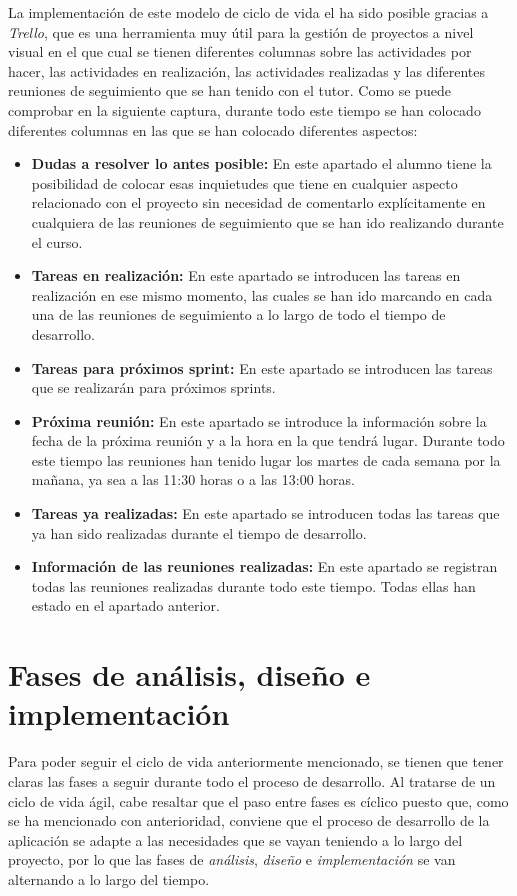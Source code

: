 La implementación de este modelo de ciclo de vida el ha sido posible gracias a
\textit{Trello}, que es una herramienta muy útil para la gestión de proyectos a
nivel visual en el que cual se tienen diferentes columnas sobre las actividades
por hacer, las actividades en realización, las actividades realizadas y las
diferentes reuniones de seguimiento que se han tenido con el tutor.
 Como se puede comprobar en la siguiente captura, durante todo este
tiempo se han colocado diferentes columnas en las que se han colocado diferentes
aspectos:
\begin{itemize}
    \item \textbf{Dudas a resolver lo antes posible: }En este apartado el alumno
    tiene la posibilidad de colocar esas inquietudes que tiene en cualquier
    aspecto relacionado con el proyecto sin necesidad de comentarlo
    explícitamente en cualquiera de las reuniones de seguimiento que se han ido
    realizando durante el curso.
    \item \textbf{Tareas en realización: }En este apartado se introducen las
    tareas en realización en ese mismo momento, las cuales se han ido marcando
    en cada una de las reuniones de seguimiento a lo largo de todo el tiempo de
    desarrollo.
    \item \textbf{Tareas para próximos sprint: }En este apartado se introducen
    las tareas que se realizarán para próximos sprints.
    \item \textbf{Próxima reunión: }En este apartado se introduce la información
    sobre la fecha de la próxima reunión y a la hora en la que tendrá lugar.
    Durante todo este tiempo las reuniones han tenido lugar los martes de cada
    semana por la mañana, ya sea a las 11:30 horas o a las 13:00 horas.
    \item \textbf{Tareas ya realizadas: }En este apartado se introducen todas
    las tareas que ya han sido realizadas durante el tiempo de desarrollo.
    \item \textbf{Información de las reuniones realizadas: }En este apartado se
    registran todas las reuniones realizadas durante todo este tiempo. Todas
    ellas han estado en el apartado anterior.
\end{itemize}



\section{Fases de análisis, diseño e implementación}
Para poder seguir el ciclo de vida anteriormente mencionado, se tienen que tener
claras las fases a seguir durante todo el proceso de desarrollo. Al tratarse de
un ciclo de vida ágil, cabe resaltar que el paso entre fases es cíclico puesto
que, como se ha mencionado con anterioridad, conviene que el proceso de
desarrollo de la aplicación se adapte a las necesidades que se vayan teniendo a
lo largo del proyecto, por lo que las fases de \textit{análisis},
\textit{diseño} e \textit{implementación} se van alternando a lo largo del
tiempo. 




